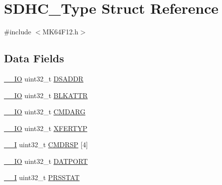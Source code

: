 \hypertarget{struct_s_d_h_c___type}{}\section{S\+D\+H\+C\+\_\+\+Type Struct Reference}
\label{struct_s_d_h_c___type}


{\ttfamily \#include $<$M\+K64\+F12.\+h$>$}

\subsection*{Data Fields}
\begin{DoxyCompactItemize}
\item 
\mbox{\hyperlink{core__cm4_8h_aec43007d9998a0a0e01faede4133d6be}{\+\_\+\+\_\+\+IO}} uint32\+\_\+t \mbox{\hyperlink{group___v_r_e_f___peripheral___access___layer_ga5faf862a2959435c8593e46ebc556ec7}{D\+S\+A\+D\+DR}}
\item 
\mbox{\hyperlink{core__cm4_8h_aec43007d9998a0a0e01faede4133d6be}{\+\_\+\+\_\+\+IO}} uint32\+\_\+t \mbox{\hyperlink{group___v_r_e_f___peripheral___access___layer_ga9f9b6d19cd4e74ea6eeaa705328e7f74}{B\+L\+K\+A\+T\+TR}}
\item 
\mbox{\hyperlink{core__cm4_8h_aec43007d9998a0a0e01faede4133d6be}{\+\_\+\+\_\+\+IO}} uint32\+\_\+t \mbox{\hyperlink{group___v_r_e_f___peripheral___access___layer_ga36131cec3559ac2988019df27ecdace4}{C\+M\+D\+A\+RG}}
\item 
\mbox{\hyperlink{core__cm4_8h_aec43007d9998a0a0e01faede4133d6be}{\+\_\+\+\_\+\+IO}} uint32\+\_\+t \mbox{\hyperlink{group___v_r_e_f___peripheral___access___layer_ga3015ac9f1cbb9fe880d346521783f479}{X\+F\+E\+R\+T\+YP}}
\item 
\mbox{\hyperlink{core__cm4_8h_af63697ed9952cc71e1225efe205f6cd3}{\+\_\+\+\_\+I}} uint32\+\_\+t \mbox{\hyperlink{group___v_r_e_f___peripheral___access___layer_gad184f191e589977878810a7928b86cca}{C\+M\+D\+R\+SP}} \mbox{[}4\mbox{]}
\item 
\mbox{\hyperlink{core__cm4_8h_aec43007d9998a0a0e01faede4133d6be}{\+\_\+\+\_\+\+IO}} uint32\+\_\+t \mbox{\hyperlink{group___v_r_e_f___peripheral___access___layer_ga1b5d16498d603c9560eaec51c9431747}{D\+A\+T\+P\+O\+RT}}
\item 
\mbox{\hyperlink{core__cm4_8h_af63697ed9952cc71e1225efe205f6cd3}{\+\_\+\+\_\+I}} uint32\+\_\+t \mbox{\hyperlink{group___v_r_e_f___peripheral___access___layer_gaa3de0ff8130a446f28bc8bceca15501c}{P\+R\+S\+S\+T\+AT}}
\item 

\end{DoxyCompactItemize}
